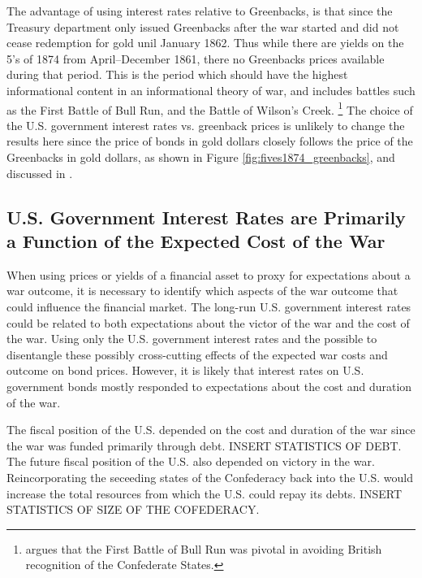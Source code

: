 The advantage of using interest rates relative to Greenbacks, is that since the Treasury department only issued Greenbacks after the war started and did not cease redemption for gold unil January 1862.
Thus while there are yields on the 5's of 1874 from April--December 1861, there no Greenbacks prices available during that period.
This is the period which should have the highest informational content in an informational theory of war, and includes battles such as the First Battle of Bull Run, and the Battle of Wilson's Creek.%
\footnote{\textcite{Poast2012} argues that the First Battle of Bull Run was pivotal in avoiding British recognition of the Confederate States.}
The choice of the U.S. government interest rates vs. greenback prices is unlikely to change the results here since the price of bonds in gold dollars closely follows the price of the Greenbacks in gold dollars, as shown in Figure \ref{fig:fives1874_greenbacks}, and discussed in \textcite{Roll1972}.



\subsection{U.S. Government Interest Rates are Primarily a Function of the Expected Cost of the War}
\label{sec:u.s.-governm-inter}

When using prices or yields of a financial asset to proxy for expectations about a war outcome, it is necessary to identify which aspects of the war outcome that could influence the financial market.
The long-run U.S. government interest rates could be related to both expectations about the victor of the war and the cost of the war.
Using only the U.S. government interest rates and the  possible to disentangle these possibly cross-cutting effects of the expected war costs and outcome on bond prices.
However, it is likely that interest rates on U.S. government bonds mostly responded to expectations about the cost and duration of the war.

The fiscal position of the U.S. depended on the cost and duration of the war since the war was funded primarily through debt.
INSERT STATISTICS OF DEBT.
The future fiscal position of the U.S. also depended on victory in the war.
Reincorporating the seceeding states of the Confederacy back into the U.S. would increase the total resources from which the U.S. could repay its debts.
INSERT STATISTICS OF SIZE OF THE COFEDERACY.

